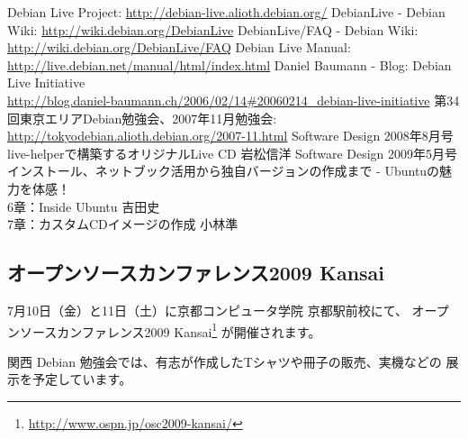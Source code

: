 \documentclass[mingoth,a4paper]{jsarticle}
\begin{document}
\newpage

\begin{thebibliography}{99}
	 Debian Live Project: \url{http://debian-live.alioth.debian.org/}
	 DebianLive - Debian Wiki: \url{http://wiki.debian.org/DebianLive}
 	 DebianLive/FAQ - Debian Wiki: \url{http://wiki.debian.org/DebianLive/FAQ}
	 Debian Live Manual: \url{http://live.debian.net/manual/html/index.html}
	 Daniel Baumann - Blog: Debian Live Initiative\\
	 \url{http://blog.daniel-baumann.ch/2006/02/14\#20060214_debian-live-initiative}
	 第34回東京エリアDebian勉強会、2007年11月勉強会:\\
	 \url{http://tokyodebian.alioth.debian.org/2007-11.html}
	 Software Design 2008年8月号\\
	 live-helperで構築するオリジナルLive CD 岩松信洋
	 Software Design 2009年5月号\\
	 インストール、ネットブック活用から独自バージョンの作成まで - Ubuntuの魅力を体感！\\
	 6章：Inside Ubuntu 吉田史\\
	 7章：カスタムCDイメージの作成 小林準
\end{thebibliography}


\subsection*{オープンソースカンファレンス2009 Kansai}

7月10日（金）と11日（土）に京都コンピュータ学院 京都駅前校にて、
オープンソースカンファレンス2009 Kansai\footnote{\url{http://www.ospn.jp/osc2009-kansai/}}
が開催されます。

関西 Debian 勉強会では、有志が作成したTシャツや冊子の販売、実機などの
展示を予定しています。


\mbox{}\newpage
\mbox{}\newpage

\printindex
 \cleartooddpage
\end{document}
